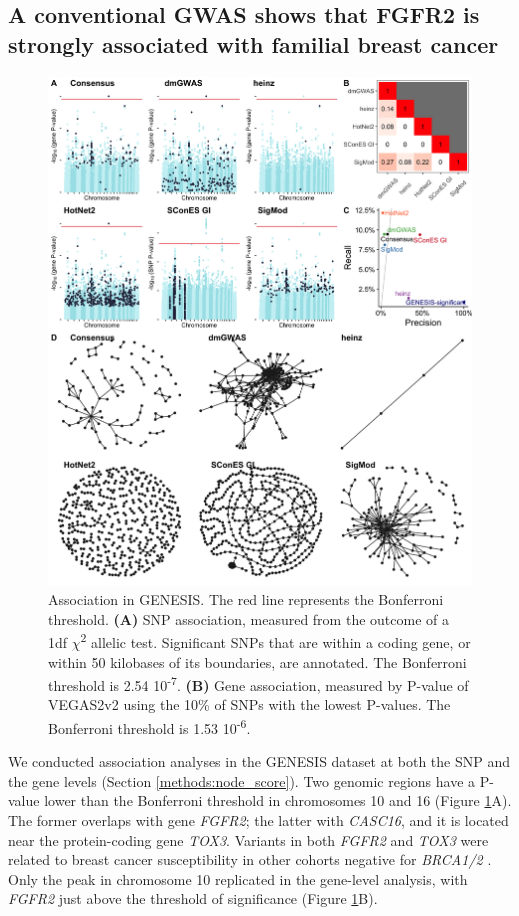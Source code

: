 \documentclass[twocolumn, 10pt]{article}
\begin{document}
\subsection{A conventional GWAS shows that FGFR2 is strongly associated with familial breast cancer}
\label{results:conventional}
\begin{figure}[htbp]
\centering
\includegraphics[width=.9\linewidth]{./figures/figure_1.png}
\caption{\label{fig:snp_gene_manhattan}
Association in GENESIS. The red line represents the Bonferroni threshold. \textbf{(A)} SNP association, measured from the outcome of a 1df \(\chi\)\textsuperscript{2} allelic test. Significant SNPs that are within a coding gene, or within 50 kilobases of its boundaries, are annotated. The Bonferroni threshold is 2.54 \texttimes{} 10\textsuperscript{-7}. \textbf{(B)} Gene association, measured by P-value of VEGAS2v2 \cite{mishra_vegas2:_2015} using the 10\% of SNPs with the lowest P-values. The Bonferroni threshold is 1.53 \texttimes{} 10\textsuperscript{-6}.}
\end{figure}

We conducted association analyses in the GENESIS dataset at both the SNP and the gene levels (Section \ref{methods:node_score}). Two genomic regions have a P-value lower than the Bonferroni threshold in chromosomes 10 and 16 (Figure \ref{fig:snp_gene_manhattan}A). The former overlaps with gene \emph{FGFR2}; the latter with \emph{CASC16}, and it is located near the protein-coding gene \emph{TOX3}. Variants in both \emph{FGFR2} and \emph{TOX3} were related to breast cancer susceptibility in other cohorts negative for \emph{BRCA1/2} \cite{rinella_genetic_2013}. Only the peak in chromosome 10 replicated in the gene-level analysis, with \emph{FGFR2} just above the threshold of significance (Figure \ref{fig:snp_gene_manhattan}B). 
\end{document}
